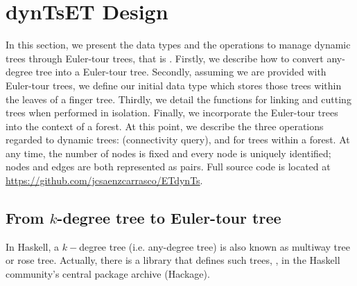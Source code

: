 \section{dynTsET Design}
\label{sec:TechDes}  



In this section, we present the data types and the operations to manage dynamic trees through Euler-tour trees, that is \dyntset. Firstly, we describe how to convert any-degree tree into a Euler-tour tree. Secondly, assuming we are provided with Euler-tour trees, we define our initial data type which stores those trees within the leaves of a finger tree. Thirdly, we detail the functions for linking and cutting trees when performed in isolation. Finally, we incorporate the Euler-tour trees into the context of a forest. At this point, we describe the three operations regarded to dynamic trees: \conn (connectivity query), \link and \cut for trees within a forest. At any time, the number of nodes is fixed and every node is uniquely identified; nodes and edges are both represented as pairs. Full source code is located at \url{https://github.com/jcsaenzcarrasco/ETdynTs}.


\subsection{From $k$-degree tree to Euler-tour tree}

In Haskell, a $k-$degree tree (i.e. any-degree tree) is also known as multiway tree or rose tree. Actually, there is a library that defines such trees, , in the Haskell community's central package archive (Hackage).

